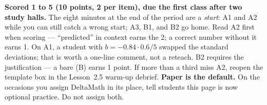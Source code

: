 \documentclass[10pt]{article}
\begin{document}
\begin{teachernote}[Homework]
\textbf{Scored 1 to 5 (10 points, 2 per item), due the first class after two study halls.} The eight
minutes at the end of the period are a \emph{start}: A1 and A2 while you can still catch a wrong
start; A3, B1, and B2 go home. Read A2 first when scoring --- ``predicted'' in context earns the
2; a correct number without it earns 1. On A1, a student with $b = -0.84 \cdot 0.6/5$ swapped
the standard deviations; that is worth a one-line comment, not a reteach. B2 requires the
justification --- a bare (B) earns 1 point. If more than a third miss A2, reopen the template
box in the Lesson~2.5 warm-up debrief. \textbf{Paper is the default.} On the occasions you assign
DeltaMath in its place, tell students this page is now
optional practice. Do not assign both.
\end{teachernote}
\end{document}
